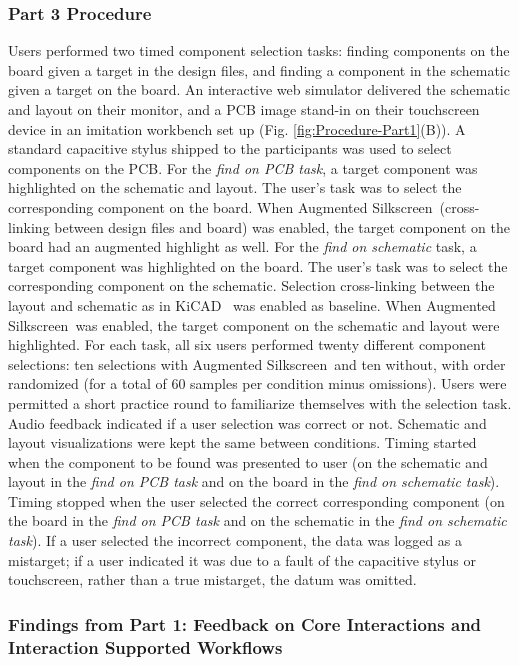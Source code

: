 \documentclass [11pt, proquest] {uwthesis}[2020/02/24]
\newcommand{\ASname}{Augmented Silkscreen}
\begin{document}
\subsubsection{Part 3 Procedure}
\label{subsec:EvalSelectProcedure}
Users performed two timed component selection tasks: finding components on the board given a target in the design files, and finding a component in the schematic given a target on the board. An interactive web simulator delivered the schematic and layout on their monitor, and a PCB image stand-in on their touchscreen device in an imitation workbench set up (Fig. \ref{fig:Procedure-Part1}(B)).
A standard capacitive stylus shipped to the participants was used to select components on the PCB. For the \textit{find on PCB task}, a target component was highlighted on the schematic and layout.
The user’s task was to select the corresponding component on the board. When \ASname\ (cross-linking between design files and board) was enabled, the target component on the board had an augmented highlight as well.
For the \textit{find on schematic} task, a target component was highlighted on the board.
The user’s task was to select the corresponding component on the schematic. Selection cross-linking between the layout and schematic as in KiCAD~\cite{KiCadSoftware} was enabled as baseline. When \ASname\ was enabled, the target component on the schematic and layout were highlighted.
For each task, all six users performed twenty different component selections: ten selections with \ASname\ and ten without, with order randomized (for a total of 60 samples per condition minus omissions).
Users were permitted a short practice round to familiarize themselves with the selection task.
Audio feedback indicated if a user selection was correct or not.
Schematic and layout visualizations were kept the same between conditions.
Timing started when the component to be found was presented to user (on the schematic and layout in the \textit{find on PCB task} and on the board in the \textit{find on schematic task}). Timing stopped when the user selected the correct corresponding component (on the board in the \textit{find on PCB task} and on the schematic in the \textit{find on schematic task}).
If a user selected the incorrect component, the data was logged as a mistarget; if a user indicated it was due to a fault of the capacitive stylus or touchscreen, rather than a true mistarget, the datum was omitted.

\subsubsection{Findings from Part 1: Feedback on Core Interactions and Interaction Supported Workflows}
\label{subsec:EvalCoreInteractions}
\end{document}
